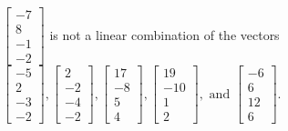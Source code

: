 \begin{exercise}
\begin{exerciseStatement}
  \end{exerciseStatement}
  \begin{exerciseAnswer}
   \(\left[\begin{array}{c}
-7 \\
8 \\
-1 \\
-2
\end{array}\right]\) 
  	 is not  
	a linear combination of the vectors \(\left[\begin{array}{c}
-5 \\
2 \\
-3 \\
-2
\end{array}\right] , \left[\begin{array}{c}
2 \\
-2 \\
-4 \\
-2
\end{array}\right] , \left[\begin{array}{c}
17 \\
-8 \\
5 \\
4
\end{array}\right] , \left[\begin{array}{c}
19 \\
-10 \\
1 \\
2
\end{array}\right] , \text{ and } \left[\begin{array}{c}
-6 \\
6 \\
12 \\
6
\end{array}\right]\).

	
  


  \end{exerciseAnswer}
\end{exercise}